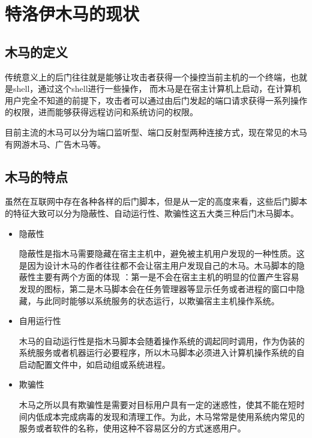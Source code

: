 \chapter{特洛伊木马的现状}
\section{木马的定义}
传统意义上的后门往往就是能够让攻击者获得一个操控当前主机的一个终端，也就是shell，通过这个shell进行一些操作，
而木马是在宿主计算机上启动，在计算机用户完全不知道的前提下，攻击者可以通过由后门发起的端口请求获得一系列操作的权限，进而能够获得远程访问和系统访问的权限。

目前主流的木马可以分为端口监听型、端口反射型两种连接方式，现在常见的木马有网游木马、广告木马等。



\section{木马的特点}
虽然在互联网中存在各种各样的后门脚本，但是从一定的高度来看，这些后门脚本的特征大致可以分为隐蔽性、自动运行性、欺骗性这五大类三种后门木马脚本。
\begin{itemize}
\item{隐蔽性}


隐蔽性是指木马需要隐藏在宿主主机中，避免被主机用户发现的一种性质。这是因为设计木马的作者往往都不会让宿主用户发现自己的木马。木马脚本的隐蔽性主要有两个方面的体现\cite{7} ：第一是不会在宿主主机的明显的位置产生容易发现的图标，第二是木马脚本会在任务管理器等显示任务或者进程的窗口中隐藏，与此同时能够以系统服务的状态运行，以欺骗宿主主机操作系统。

\item{自用运行性}


木马的自动运行性是指木马脚本会随着操作系统的调起同时调用，作为伪装的系统服务或者机器运行必要程序，所以木马脚本必须进入计算机操作系统的自启动配置文件中，如启动组或系统进程。

\item{欺骗性}


木马之所以具有欺骗性是需要对目标用户具有一定的迷惑性，使其不能在短时间内低成本完成病毒的发现和清理工作。为此，木马常常是使用系统内常见的服务或者软件的名称，使用这种不容易区分的方式迷惑用户。
\end{itemize}

